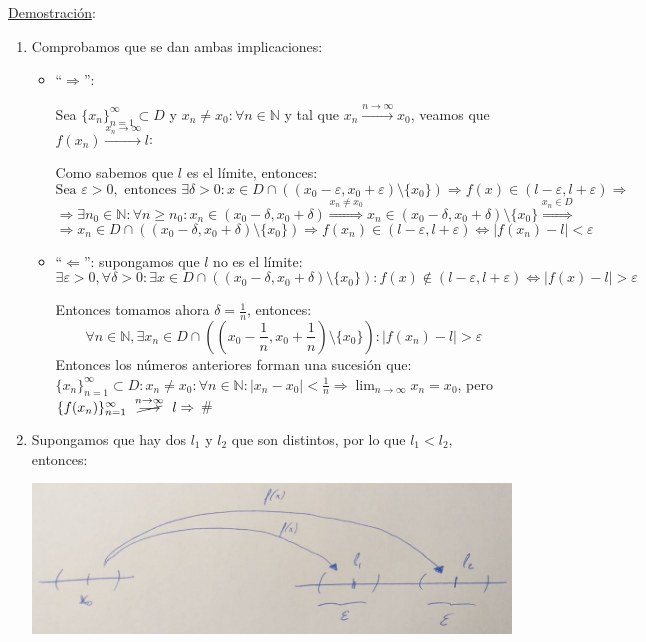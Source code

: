 \documentclass[10pt,a4paper,openright]{book}
\begin{document}
\underline{Demostración}:
\begin{enumerate}
\item Comprobamos que se dan ambas implicaciones:
	\begin{itemize}
	\item ``$\Rightarrow$'': \par
	Sea $\{x_n\}_{n=1}^\infty\subset D$ y $x_n\neq x_0: \forall n\in \mathbb N$ y tal que $x_n\xrightarrow{n\rightarrow \infty} x_0$, veamos que $f(x_n)\xrightarrow{x_n\rightarrow \infty} l$:
	
	Como sabemos que $l$ es el límite, entonces:
	$$\mbox{Sea }\varepsilon>0,\mbox{ entonces } \exists \delta >0: x\in D\cap \left((x_0-\varepsilon, x_0+\varepsilon)\mbox{\textbackslash} \{x_0\}\right)\Rightarrow f(x)\in (l-\varepsilon, l+\varepsilon)\Rightarrow$$
	$$\Rightarrow \exists n_0\in \mathbb N: \forall n\geq n_0: x_n \in (x_0-\delta, x_0+\delta)\stackrel{x_n\neq x_0}{\Rightarrow}x_n \in (x_0-\delta, x_0+\delta)\mbox{\textbackslash}\{x_0\}\stackrel{x_n\in D}{\Rightarrow}$$
	$$\Rightarrow  x_n \in D\cap\left((x_0-\delta, x_0+\delta)\mbox{\textbackslash}\{x_0\}\right)\Rightarrow f(x_n)\in (l-\varepsilon, l+\varepsilon)\Leftrightarrow |f(x_n)-l|<\varepsilon$$
	
	\item ``$\Leftarrow$'': supongamos que $l$ no es el límite:
	$$\exists \varepsilon>0, \forall \delta>0: \exists x\in D\cap \left((x_0-\delta, x_0+\delta)\mbox{\textbackslash} \{x_0\}\right): f(x)\notin (l-\varepsilon, l+\varepsilon)\Leftrightarrow |f(x)-l|>\varepsilon$$
	
	Entonces tomamos ahora $\delta=\frac{1}{n}$, entonces:
	$$\forall n\in \mathbb N, \exists x_n\in D\cap \left((x_0-\frac{1}{n}, x_0+\frac{1}{n})\mbox{\textbackslash} \{x_0\}\right): |f(x_n)-l|>\varepsilon$$
	Entonces los números anteriores forman una sucesión que: $\{x_n\}_{n=1}^\infty\subset D: x_n\neq x_0: \forall n\in \mathbb N: |x_n-x_0|<\frac{1}{n}\Rightarrow \lim_{n\rightarrow\infty} x_n=x_0$, pero $\{f(x_n)\}_{n=1}^\infty \mbox{ }\stackrel{n\rightarrow\infty}{\cancel{\longrightarrow}}\mbox{ } l\Rightarrow$ \#	
	\end{itemize}
	
\item Supongamos que hay dos $l_1$ y $l_2$ que son distintos, por lo que $l_1<l_2$, entonces:

\begin{center}
\includegraphics[scale=0.30]{limite doble}
\end{center}


\end{enumerate}
\end{document}

